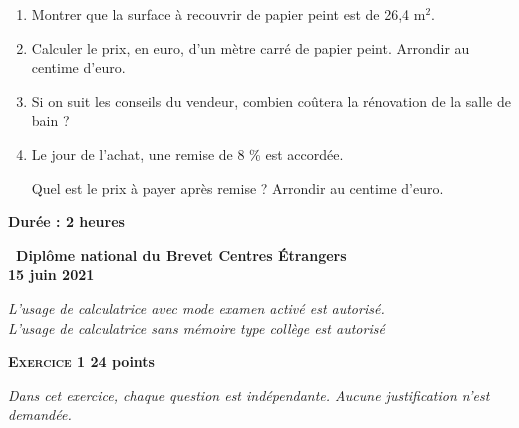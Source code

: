 \documentclass[11pt]{article}
\begin{document}
	\begin{enumerate}
		\item Montrer que la surface à recouvrir de papier peint est de 26,4 m$^2$.
		
		\item Calculer le prix, en euro, d’un mètre carré de papier peint.
		Arrondir au centime d'euro.
		
		\item Si on suit les conseils du vendeur, combien coûtera la rénovation de la salle de bain ?
		
		\item Le jour de l'achat, une remise de 8 \% est accordée.
		
Quel est le prix à payer après remise ? Arrondir au centime d'euro.
	\end{enumerate}
\newpage
\hypertarget{Etranger}{}

\label{Etranger}

\pagestyle{fancy}
\thispagestyle{empty}

\begin{center}\textbf{Durée : 2 heures}

\vspace{0,5cm}

{\Large\textbf{\decofourleft~Diplôme national du Brevet
Centres Étrangers~\decofourright}}\\[6pt]
{\Large \textbf{15 juin 2021}}

\medskip

\emph{L'usage de calculatrice avec mode examen activé est autorisé.\\
L'usage de calculatrice sans mémoire \og type collège \fg{} est autorisé}

\end{center}

\vspace{0,5cm}

\textbf{{\large \textsc{Exercice 1}} \hfill 24 points}

	\emph{Dans cet exercice, chaque question est indépendante. Aucune justification n'est demandée.}
	
\end{document}
